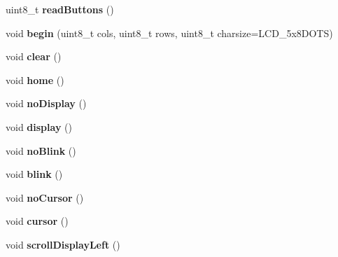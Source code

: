 \begin{DoxyCompactItemize}
uint8\+\_\+t {\bfseries read\+Buttons} ()
\item 
\mbox{\label{classAdafruit__RGBLCDShield_a66d7b674675ee94e27c1da22408bb110}} 
void {\bfseries begin} (uint8\+\_\+t cols, uint8\+\_\+t rows, uint8\+\_\+t charsize=L\+C\+D\+\_\+5x8\+D\+O\+TS)
\item 
\mbox{\label{classAdafruit__RGBLCDShield_ad203e22075b6a8b63e9e206105bcc433}} 
void {\bfseries clear} ()
\item 
\mbox{\label{classAdafruit__RGBLCDShield_a891869292cf384f7edb2c4b7ec17c949}} 
void {\bfseries home} ()
\item 
\mbox{\label{classAdafruit__RGBLCDShield_a9217b8b2d85e14e01210e281f52693f0}} 
void {\bfseries no\+Display} ()
\item 
\mbox{\label{classAdafruit__RGBLCDShield_aa721251c365c8033ac872c18ad64b93f}} 
void {\bfseries display} ()
\item 
\mbox{\label{classAdafruit__RGBLCDShield_a493eacb69308fba363c81d0036e413ea}} 
void {\bfseries no\+Blink} ()
\item 
\mbox{\label{classAdafruit__RGBLCDShield_a5a9697632b6ded2d3d76cf903f9fd3a9}} 
void {\bfseries blink} ()
\item 
\mbox{\label{classAdafruit__RGBLCDShield_a50826483484df49caee7c7851310d802}} 
void {\bfseries no\+Cursor} ()
\item 
\mbox{\label{classAdafruit__RGBLCDShield_a3b041610ba67c0c0e343a7b18b6e668e}} 
void {\bfseries cursor} ()
\item 
\mbox{\label{classAdafruit__RGBLCDShield_ac3383b76397c5cd24cd62a5a67acb074}} 
void {\bfseries scroll\+Display\+Left} ()
\item 
\mbox{\label{classAdafruit__RGBLCDShield_a75adee42b56d8d64a7f5ff4bafe9c669}} 

\end{DoxyCompactItemize}
